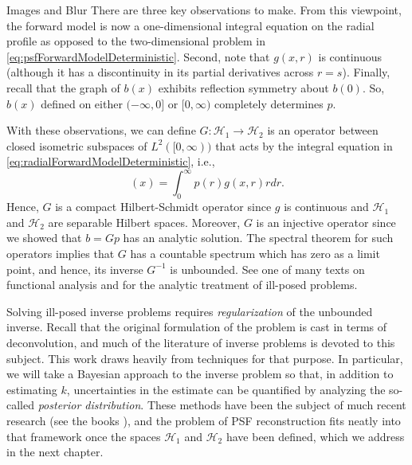 \begin{chapter}{Images and Blur}
  There are three key observations to make.
  From this viewpoint, the forward model is now a one-dimensional integral equation on the radial profile as opposed to the two-dimensional problem in \eqref{eq:psfForwardModelDeterministic}.
  Second, note that $g(x,r)$ is continuous (although it has a discontinuity in its partial derivatives across $r=s$).
  Finally, recall that the graph of $b(x)$ exhibits reflection symmetry about $b(0)$.
  So, $b(x)$ defined on either $(-\infty,0]$ or $[0,\infty)$ completely determines $p$.

  With these observations, we can define $G: \mathcal H_1 \to \mathcal H_2$ is an operator between closed isometric subspaces of $L^2([0,\infty))$ that acts by the integral equation in \eqref{eq:radialForwardModelDeterministic}, i.e., 
  \begin{equation}
    [Gp](x) = \int_0^\infty p(r) g(x,r) r dr.
  \end{equation}
  Hence, $G$ is a compact Hilbert-Schmidt operator since $g$ is continuous and $\mathcal H_1$ and $\mathcal H_2$ are separable Hilbert spaces.
  Moreover, $G$ is an injective operator since we showed that $b = Gp$ has an analytic solution. 
  The spectral theorem for such operators implies that $G$ has a countable spectrum which has zero as a limit point, and hence, its inverse $G^{-1}$ is unbounded. %
  See one of many texts on functional analysis \citep{bachman1966,rudin1991} and \citep{tikhonov1963,vogel2002,morozov1993} for the analytic treatment of ill-posed problems.

  Solving ill-posed inverse problems requires \emph{regularization} of the unbounded inverse.
  Recall that the original formulation of the problem is cast in terms of deconvolution, and much of the literature of inverse problems is devoted to this subject.
  This work draws heavily from techniques for that purpose. 
  In particular, we will take a Bayesian approach to the inverse problem so that, in addition to estimating $k$, uncertainties in the estimate can be quantified by analyzing the so-called \emph{posterior distribution}.
  These methods have been the subject of much recent research (see the books \citep{calvetti2007introduction,kaipo2005,stuart2010}), and the problem of PSF reconstruction fits neatly into that framework once the spaces $\mathcal H_1$ and $\mathcal H_2$ have been defined, which we address in the next chapter.

\end{chapter}
